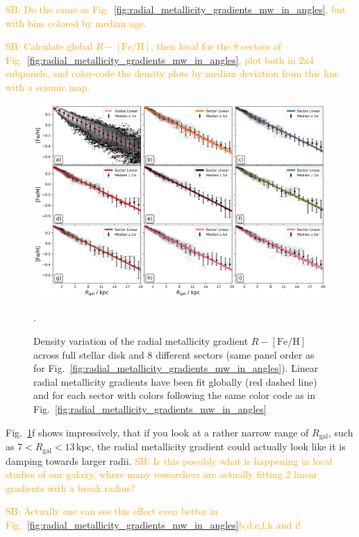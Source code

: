 \documentclass[fleqn,usenatbib]{mnras}
\newcommand{\SB}[1]{{\textcolor{orange}{SB: #1}}}
\begin{document}
\SB{Do the same as Fig.~\ref{fig:radial_metallicity_gradients_mw_in_angles}, but with bins colored by median age.}

\SB{Calculate global $R-\mathrm{[Fe/H]}$, then local for the 8 sectors of Fig.~\ref{fig:radial_metallicity_gradients_mw_in_angles}, plot both in 2x4 subpanels, and color-code the density plots by median deviation from this line with a seismic map.}


\begin{figure}
    \centering
    \includegraphics[width=\textwidth]{figures/linear_radial_metallicity_gradients_mw_in_angles.png}
    \caption{Density variation of the radial metallicity gradient $R-\mathrm{[Fe/H]}$ across full stellar disk and 8 different sectors (same panel order as for Fig.~\ref{fig:radial_metallicity_gradients_mw_in_angles}). Linear radial metallicity gradients have been fit globally (red dashed line) and for each sector with colors following the same color code as in Fig.~\ref{fig:radial_metallicity_gradients_mw_in_angles}}.
    \label{fig:linear_radial_metallicity_gradients_mw_in_angles}
\end{figure}

Fig.~\ref{fig:linear_radial_metallicity_gradients_mw_in_angles}f shows impressively, that if you look at a rather narrow range of $R_\mathrm{gal}$, such as $7 < R_\mathrm{gal} < 13\,\mathrm{kpc}$, the radial metallicity gradient could actually look like it is damping towards larger radii. \SB{Is this possibly what is happening in local studies of our galaxy, where many researchers are actually fitting 2 linear gradients with a break radius?}

\SB{Actually one can see this effect even better in Fig.~\ref{fig:radial_metallicity_gradients_mw_in_angles}b,d,e,f,h and i!}
\end{document}
